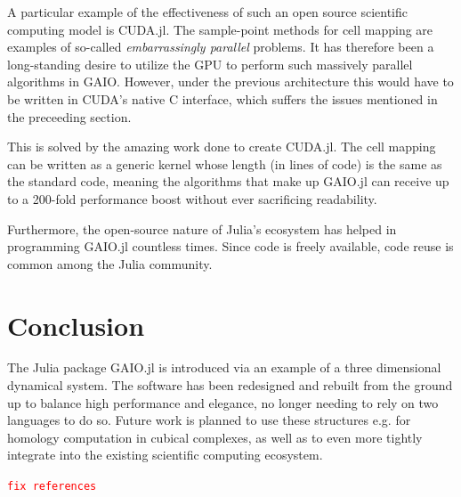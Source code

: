 \documentclass{juliacon}
\newcommand{\todo}[1]{\textcolor{red}{\texttt{#1}}}
\begin{document}
A particular example of the effectiveness of such an open source scientific computing model is CUDA.jl. The sample-point methods for cell mapping are examples of so-called \emph{embarrassingly parallel} \cite{parallel} problems. It has therefore been a long-standing desire to utilize the GPU to perform such massively parallel algorithms in GAIO. However, under the previous architecture this would have to be written in CUDA's native C interface, which suffers the issues mentioned in the preceeding section. 

This is solved by the amazing work done to create CUDA.jl. The cell mapping can be written as a generic kernel whose length (in lines of code) is the same as the standard code, meaning the algorithms that make up GAIO.jl can receive up to a 200-fold \cite{gaiocuda} performance boost without ever sacrificing readability. 

Furthermore, the open-source nature of Julia's ecosystem has helped in programming GAIO.jl countless times. Since code is freely available, code reuse is common among the Julia community.

\section{Conclusion}

The Julia package GAIO.jl is introduced via an example of a three dimensional dynamical system. The software has been redesigned and rebuilt from the ground up to balance high performance and elegance, no longer needing to rely on two languages to do so. Future work is planned to use these structures e.g. for homology computation in cubical complexes, as well as to even more tightly integrate into the existing scientific computing ecosystem.

\todo{fix references}


\end{document}

